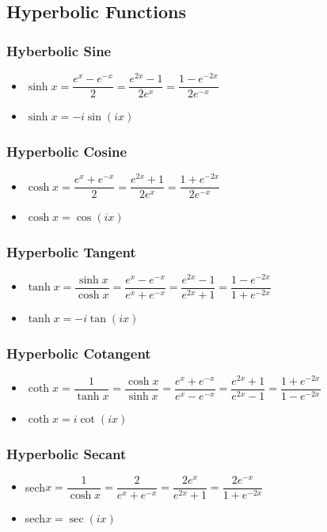 \documentclass[]{report}
\newcommand \tab[1][1cm]{\hspace*{#1}}
\newcommand{\itemt}{\item \tab}
\begin{document}
\subsection{Hyperbolic Functions}

\subsubsection{Hyberbolic Sine}
\begin{itemize}
\itemt \( \sinh x = \dfrac{e^x - e^{-x}}{2} = \dfrac{e^{2x}-1}{2e^x} = \dfrac{1-e^{-2x}}{2e^{-x}} \)
\itemt \( \sinh x = -i\sin(ix) \)
\end{itemize}			

\subsubsection{Hyperbolic Cosine}			
\begin{itemize}
\itemt \( \cosh x = \dfrac{e^x + e^{-x}}{2} = \dfrac{e^{2x}+1}{2e^x} = \dfrac{1+e^{-2x}}{2e^{-x}} \)
\itemt \( \cosh x = \cos(ix) \)
\end{itemize}

\subsubsection{Hyperbolic Tangent}			
\begin{itemize}
\itemt \( \tanh x = \dfrac{\sinh x}{\cosh x} = \dfrac{e^x - e^{-x}}{e^x + e^{-x}} =  \dfrac{e^{2x}-1}{e^{2x}+1} = \dfrac{1-e^{-2x}}{1+e^{-2x}} \)
\itemt \( \tanh x = -i\tan(ix) \)
\end{itemize}

\subsubsection{Hyperbolic Cotangent}			
\begin{itemize}
\itemt \( \coth x = \dfrac{1}{\tanh x} = \dfrac{\cosh x}{\sinh x} = \dfrac{e^x + e^{-x}}{e^x - e^{-x}} =  \dfrac{e^{2x}+1}{e^{2x}-1} = \dfrac{1+e^{-2x}}{1-e^{-2x}} \)
\itemt \( \coth x = i\cot(ix) \)
\end{itemize}

\subsubsection{Hyperbolic Secant}			
\begin{itemize}
\itemt sech\(x = \dfrac{1}{\cosh x} = \dfrac{2}{e^x + e^{-x}} = \dfrac{2e^x}{e^{2x}+1} = \dfrac{2e^{-x}}{1+e^{-2x}} \)
\itemt sech\(x = \sec(ix) \)
\end{itemize}
\end{document}
